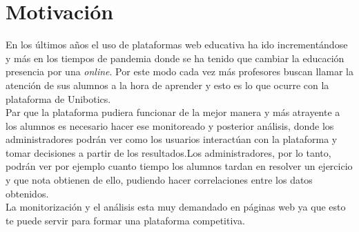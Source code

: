 \section{Motivación}

En los últimos años el uso de plataformas web educativa ha ido incrementándose y más en los tiempos de pandemia donde se ha tenido que cambiar la educación presencia por una \textit{online}. Por este modo cada vez más profesores buscan llamar la atención de sus alumnos a la hora de aprender y esto es lo que ocurre con la plataforma de Unibotics.\\

Par que la plataforma pudiera funcionar de la mejor manera y más atrayente a los alumnos es necesario hacer ese monitoreado y posterior análisis, donde los administradores podrán ver como los usuarios interactúan con la plataforma y tomar decisiones a partir de los resultados.Los administradores, por lo tanto, podrán ver por ejemplo cuanto tiempo los alumnos tardan en resolver un ejercicio y que nota obtienen de ello, pudiendo hacer correlaciones entre los datos obtenidos.\\

La monitorización y el análisis esta muy demandado en páginas web ya que esto te puede servir para formar una plataforma competitiva.\\








